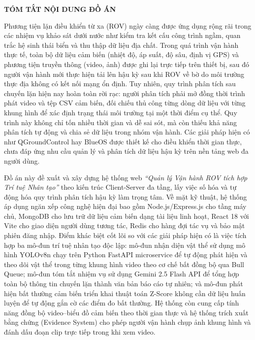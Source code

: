 \documentclass[../DoAn.tex]{subfiles}
\begin{document}
\begin{center}
    \Large{\textbf{TÓM TẮT NỘI DUNG ĐỒ ÁN}}\\
\end{center}
\vspace{1cm}

Phương tiện lặn điều khiển từ xa (ROV) ngày càng được ứng dụng rộng rãi trong các nhiệm vụ khảo sát dưới nước như kiểm tra kết cấu công trình ngầm, quan trắc hệ sinh thái biển và thu thập dữ liệu địa chất. Trong quá trình vận hành thực tế, toàn bộ dữ liệu cảm biến (nhiệt độ, áp suất, độ sâu, định vị GPS) và phương tiện truyền thông (video, ảnh) được ghi lại trực tiếp trên thiết bị, sau đó người vận hành mới thực hiện tải lên hậu kỳ sau khi ROV về bờ do môi trường thực địa không có kết nối mạng ổn định. Tuy nhiên, quy trình phân tích sau chuyến lặn hiện nay hoàn toàn rời rạc: người phân tích phải mở đồng thời trình phát video và tệp CSV cảm biến, đối chiếu thủ công từng dòng dữ liệu với từng khung hình để xác định trạng thái môi trường tại một thời điểm cụ thể. Quy trình này không chỉ tốn nhiều thời gian và dễ sai sót, mà còn thiếu khả năng phân tích tự động và chia sẻ dữ liệu trong nhóm vận hành. Các giải pháp hiện có như QGroundControl hay BlueOS được thiết kế cho điều khiển thời gian thực, chưa đáp ứng nhu cầu quản lý và phân tích dữ liệu hậu kỳ trên nền tảng web đa người dùng.

Đồ án này đề xuất và xây dựng hệ thống web \textit{``Quản lý Vận hành ROV tích hợp Trí tuệ Nhân tạo''} theo kiến trúc Client-Server đa tầng, lấy việc số hóa và tự động hóa quy trình phân tích hậu kỳ làm trọng tâm. Về mặt kỹ thuật, hệ thống áp dụng ngăn xếp công nghệ hiện đại bao gồm Node.js/Express.js cho tầng máy chủ, MongoDB cho lưu trữ dữ liệu cảm biến dạng tài liệu linh hoạt, React 18 với Vite cho giao diện người dùng tương tác, Redis cho hàng đợi tác vụ và bảo mật phiên đăng nhập. Điểm khác biệt cốt lõi so với các giải pháp hiện có là việc tích hợp ba mô-đun trí tuệ nhân tạo độc lập: mô-đun nhận diện vật thể sử dụng mô hình YOLOv8n chạy trên Python FastAPI microservice để tự động phát hiện và theo dõi vật thể trong từng khung hình video theo cơ chế bất đồng bộ qua Bull Queue; mô-đun tóm tắt nhiệm vụ sử dụng Gemini 2.5 Flash API để tổng hợp toàn bộ thông tin chuyến lặn thành văn bản báo cáo tự nhiên; và mô-đun phát hiện bất thường cảm biến triển khai thuật toán Z-Score không cần dữ liệu huấn luyện để tự động gắn cờ các điểm đo bất thường. Hệ thống còn cung cấp tính năng đồng bộ video--biểu đồ cảm biến theo thời gian thực và hệ thống trích xuất bằng chứng (Evidence System) cho phép người vận hành chụp ảnh khung hình và đánh dấu đoạn clip trực tiếp trong khi xem video.
\end{document}
